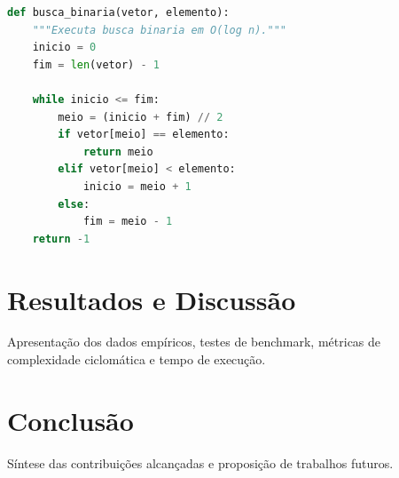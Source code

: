 \documentclass[
    12pt,               %
    openright,          %
    oneside,            %
    a4paper,            %
    english,            %
    brazil              %
]{abntex2}
\begin{document}
\begin{lstlisting}[language=Python, caption={Exemplo de algoritmo de busca em Python.}]
def busca_binaria(vetor, elemento):
    """Executa busca binaria em O(log n)."""
    inicio = 0
    fim = len(vetor) - 1
    
    while inicio <= fim:
        meio = (inicio + fim) // 2
        if vetor[meio] == elemento:
            return meio
        elif vetor[meio] < elemento:
            inicio = meio + 1
        else:
            fim = meio - 1
    return -1
\end{lstlisting}

\chapter{Resultados e Discussão}
Apresentação dos dados empíricos, testes de benchmark, métricas de complexidade ciclomática e tempo de execução.

\chapter{Conclusão}
Síntese das contribuições alcançadas e proposição de trabalhos futuros.

\postextual


\end{document}
